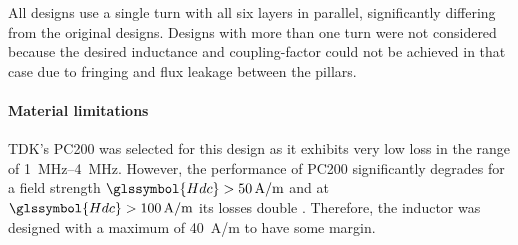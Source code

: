 \documentclass{IPEC2026}
\newcommand{\sbl}[1]{\glssymbol{#1}}
\begin{document}
\par All designs use a single turn with all six layers in parallel, significantly differing from the original designs.
Designs with more than one turn were not considered because the desired inductance and coupling-factor could not be achieved in that case due to fringing and flux leakage between the pillars.

\paragraph{Material limitations}
TDK's PC200 was selected for this design as it exhibits very low loss in the range of \qtyrange{1}{4}{\MHz}. However, the performance of PC200 significantly degrades for a field strength $\sbl{Hdc} > \qty{50}{A/m}$ and at $\sbl{Hdc} > \qty{100}{A/m}$ its losses double%
\cite{tdkHighFrequencyLowLossFerrite}. Therefore, the inductor was designed with a maximum \sbl{Hdc} of \qty{40}{A/m} to have some margin.
\end{document}
